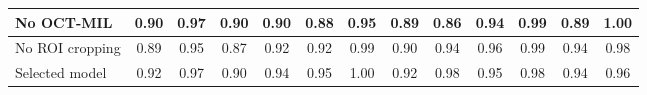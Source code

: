 \documentclass{ieeeaccess}
\begin{document}
\begin{table}[!t]
{\begin{tabular}{|l|cccc|cccc|cccc|}
            \hline
            No OCT-MIL
                                                       & 0.90 & 0.97 & 0.90 & 0.90
                                                       & 0.88 & 0.95 & 0.89 & 0.86
                                                       & 0.94 & 0.99 & 0.89 & 1.00 \\
            \hline
            No ROI cropping
                                                       & 0.89 & 0.95 & 0.87 & 0.92
                                                       & 0.92 & 0.99 & 0.90 & 0.94
                                                       & 0.96 & 0.99 & 0.94 & 0.98 \\
            \hline
            Selected model
                                                       & 0.92 & 0.97 & 0.90 & 0.94
                                                       & 0.95 & 1.00 & 0.92 & 0.98
                                                       & 0.95 & 0.98 & 0.94 & 0.96 \\
            \hline
        \end{tabular}}
\end{table}
\end{document}
